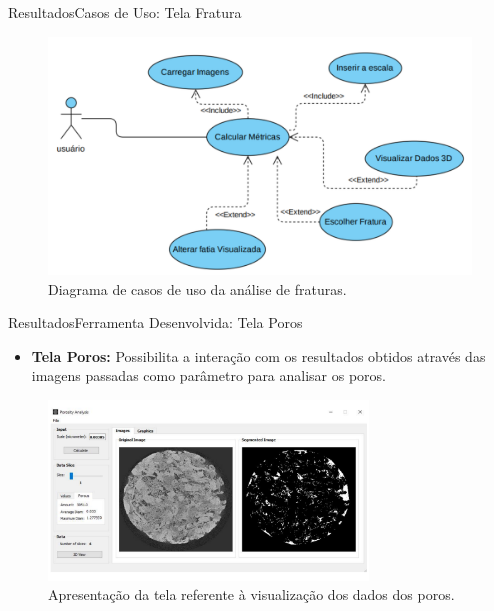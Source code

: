 \documentclass{beamer}
\begin{document}
\begin{frame}{Resultados}{Casos de Uso: Tela Fratura}
        
    \begin{figure}[!htb]
    \centering
    \includegraphics[width=12cm]{fig/casos-2.pdf}\\
    \scriptsize{Diagrama de casos de uso da análise de fraturas.}
    \end{figure}
\end{frame}


\begin{frame}{Resultados}{Ferramenta Desenvolvida: Tela Poros}
    \begin{itemize}
        \item \textbf{Tela Poros:} Possibilita a interação com os resultados obtidos através das imagens passadas como parâmetro para analisar os poros.
    \end{itemize}
          
   \begin{figure}[!htb]
    \centering
    \includegraphics[width=8.5cm]{fig/tela-poro-1.pdf}\\
    \scriptsize{Apresentação da tela referente à visualização dos dados dos poros.}
    \end{figure}
\end{frame}
\end{document}
